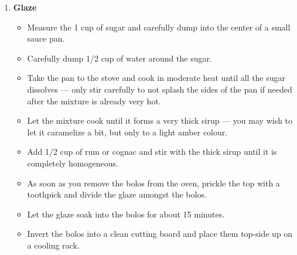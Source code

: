 \documentclass[11pt,letterpaper]{article}
\begin{document}
\begin{description}
\begin{enumerate}
         \item {\bf Glaze}
       	\begin{itemize}
        \item Measure the 1 cup of sugar and carefully dump into the center of a small sauce pan.
        \item Carefully dump 1/2 cup of water around the sugar. 
        \item Take the pan to the stove and cook in moderate heat until all the sugar dissolves --- only stir carefully to not splash the sides of the pan if needed after the mixture is already very hot.
        \item Let the mixture cook until it forms a very thick sirup --- you may wish to let it caramelize a bit, but only to a light amber colour.
        \item Add 1/2 cup of rum or cognac and stir with the thick sirup until it is completely homogeneous.
        \item As soon as you remove the bolos from the oven, prickle the top with a toothpick and divide the glaze amongst the bolos.
        \item Let the glaze soak into the bolos for about 15 minutes.
        \item Invert the bolos into a clean cutting board and place them top-side up on a cooling rack.
         \end{itemize}
     	\end{enumerate}         
\end{description}
\end{document}

